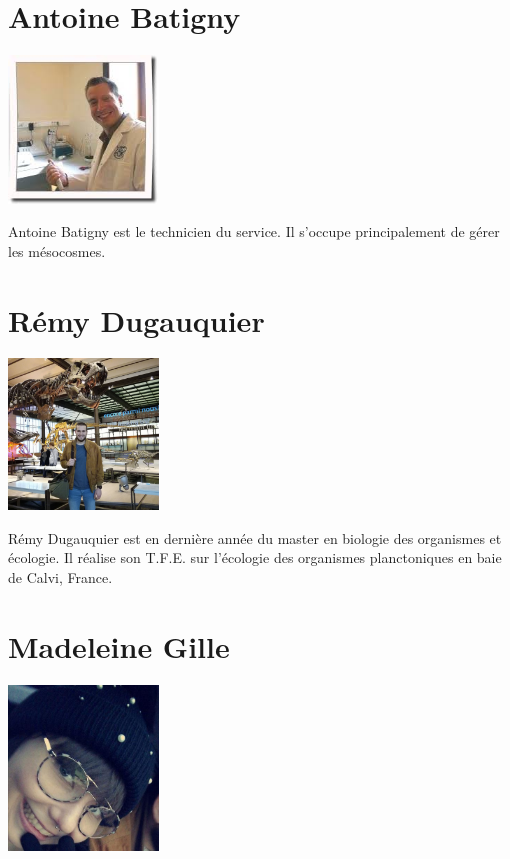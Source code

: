 \documentclass[]{report}
\begin{document}
\section{Antoine Batigny}\label{antoine-batigny}

\includegraphics[width=4.00000cm]{../image/antoine2.jpg}

Antoine Batigny est le technicien du service. Il s'occupe principalement
de gérer les mésocosmes.

\section{Rémy Dugauquier}\label{remy-dugauquier}

\includegraphics[width=4.00000cm]{../image/remy.jpg}

Rémy Dugauquier est en dernière année du master en biologie des
organismes et écologie. Il réalise son T.F.E. sur l'écologie des
organismes planctoniques en baie de Calvi, France.

\section{Madeleine Gille}\label{madeleine-gille}

\includegraphics[width=4.00000cm]{../image/madeleine.jpg}
\end{document}
